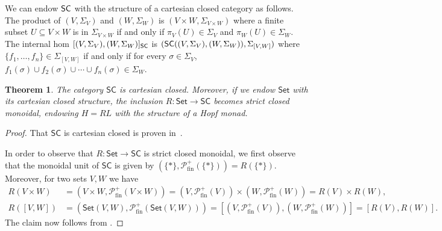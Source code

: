 \documentclass[12pt,dvipsnames,oneside]{amsart}
\theoremstyle{plain}
\newtheorem{theorem}[proposition]{Theorem}
\theoremstyle{remark}
\theoremstyle{definition}
\newcommand*{\from}{\colon}
\newcommand{\Set}{\mathsf{Set}}
\newcommand{\forget}{U}
\newcommand{\cP}{\mathcal{P}}
\begin{document}
We can endow \({\sf SC}\) with the structure of a cartesian closed category as follows.
The product of \((V,\Sigma_V)\) and \((W,\Sigma_W)\) is \((V \times W, \Sigma_{V \times W})\) where a finite subset \(\forget \subseteq V \times W\) is in \(\Sigma_{V \times W}\) if and only if \(\pi_V(\forget) \in \Sigma_V\) and \(\pi_W(\forget) \in \Sigma_W\).
The internal hom \([(V,\Sigma_V),(W,\Sigma_W)]_{{\sf SC}}\) is \(({\sf SC}((V,\Sigma_V),(W,\Sigma_W)),\Sigma_{[V,W]})\) where \(\{f_1,\ldots,f_n\} \in \Sigma_{[V,W]}\) if and only if for every \(\sigma \in \Sigma_V\), \(f_1(\sigma) \cup f_2(\sigma) \cup \cdots \cup f_n(\sigma) \in \Sigma_W\).

\begin{theorem}\label{thm:Hopf-monad-set}
  The category \(\mathsf{SC}\) is cartesian closed.
  Moreover, if we endow \(\Set\) with its cartesian closed structure,  the inclusion \(R\from \Set\to \mathsf{SC}\) becomes strict closed monoidal, endowing \(H=RL\) with the structure of a Hopf monad.
\end{theorem}
\begin{proof}
  That \(\mathsf{SC}\) is cartesian closed is proven in~\cite[Chapter IV, \S7]{Eilenberg-Kelly}.

  In order to observe that \(R \from \Set\to \mathsf{SC}\) is strict closed monoidal, we first observe that the monoidal unit of \(\mathsf{SC}\) is given by \((\{\ast\}, \cP_{\mathrm{fin}}^{+}(\{\ast\})) = R(\{\ast\})\).
  Moreover, for two sets \(V, W\) we have
  \begin{align*}
    R(V\times W) &= (V\times W, \cP_{\mathrm{fin}}^{+}(V\times W)) = (V, \cP_{\mathrm{fin}}^{+}(V)) \times (W, \cP_{\mathrm{fin}}^{+}(W)) = R(V) \times R(W),\\
    R([V,W]) &= (\Set(V,W), \cP_{\mathrm{fin}}^{+}(\Set(V,W))) = [(V, \cP_{\mathrm{fin}}^{+}(V)), (W, \cP_{\mathrm{fin}}^{+}(W))] = [R(V), R(W)].
  \end{align*}
  The claim now follows from \cite[Theorem~3.6]{BruguieresLackVirelizier}.
\end{proof}
\end{document}
